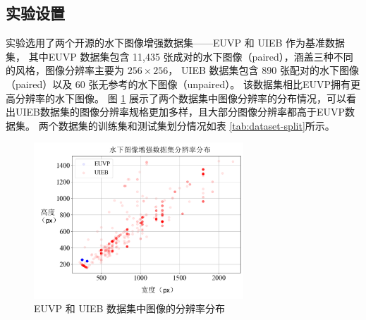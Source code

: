\subsection{实验设置}
实验选用了两个开源的水下图像增强数据集——EUVP \cite{funie_gan} 和 UIEB \cite{uieb} 作为基准数据集，
其中EUVP 数据集包含 11,435 张成对的水下图像（paired），涵盖三种不同的风格，图像分辨率主要为 $256 \times 256$，
UIEB 数据集包含 890 张配对的水下图像（paired）以及 60 张无参考的水下图像（unpaired）。
该数据集相比EUVP拥有更高分辨率的水下图像。
图 \ref{img:scatter} 展示了两个数据集中图像分辨率的分布情况，可以看出UIEB数据集的图像分辨率规格更加多样，且大部分图像分辨率都高于EUVP数据集。
两个数据集的训练集和测试集划分情况如表 \ref{tab:dataset-split}所示。
\begin{figure}[ht]
    \centering
    \includegraphics[width=0.7\textwidth]{figures/ch3/scatter.pdf} \hspace{0.7cm}
    \caption{EUVP 和 UIEB 数据集中图像的分辨率分布}
    \label{img:scatter}
\end{figure}

\begin{table}[ht]
	\vspace{-0.4mm}
	\centering
	\caption{\label{tab:dataset-split}EUVP与UIEB数据集划分}
	\vspace{-2mm}
	\vspace{-1mm}
\end{table}   


